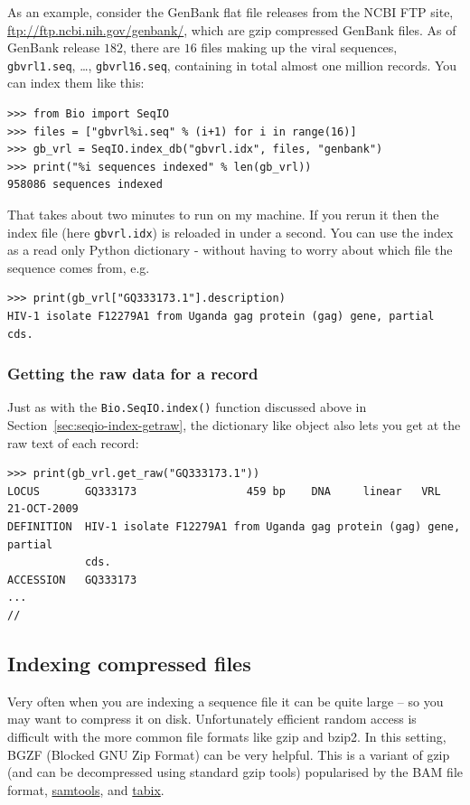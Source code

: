 \documentclass{report}
\begin{document}
As an example, consider the GenBank flat file releases from the NCBI FTP site,
\url{ftp://ftp.ncbi.nih.gov/genbank/}, which are gzip compressed GenBank files.
As of GenBank release $182$, there are $16$ files making up the viral sequences,
\texttt{gbvrl1.seq}, \ldots, \texttt{gbvrl16.seq}, containing in total almost
one million records. You can index them like this:

\begin{verbatim}
>>> from Bio import SeqIO
>>> files = ["gbvrl%i.seq" % (i+1) for i in range(16)]
>>> gb_vrl = SeqIO.index_db("gbvrl.idx", files, "genbank")
>>> print("%i sequences indexed" % len(gb_vrl))
958086 sequences indexed
\end{verbatim}

That takes about two minutes to run on my machine. If you rerun it then the
index file (here \texttt{gbvrl.idx}) is reloaded in under a second. You can
use the index as a read only Python dictionary - without having to worry
about which file the sequence comes from, e.g.

\begin{verbatim}
>>> print(gb_vrl["GQ333173.1"].description)
HIV-1 isolate F12279A1 from Uganda gag protein (gag) gene, partial cds.
\end{verbatim}

\subsubsection{Getting the raw data for a record}

Just as with the \verb|Bio.SeqIO.index()| function discussed above in
Section~\ref{sec:seqio-index-getraw}, the dictionary like object also lets you
get at the raw text of each record:

\begin{verbatim}
>>> print(gb_vrl.get_raw("GQ333173.1"))
LOCUS       GQ333173                 459 bp    DNA     linear   VRL 21-OCT-2009
DEFINITION  HIV-1 isolate F12279A1 from Uganda gag protein (gag) gene, partial
            cds.
ACCESSION   GQ333173
...
//
\end{verbatim}

\subsection{Indexing compressed files}
\label{sec:SeqIO-index-bgzf}

Very often when you are indexing a sequence file it can be quite large -- so
you may want to compress it on disk. Unfortunately efficient random access
is difficult with the more common file formats like gzip and bzip2. In this
setting, BGZF (Blocked GNU Zip Format) can be very helpful. This is a variant
of gzip (and can be decompressed using standard gzip tools) popularised by
the BAM file format, \href{http://samtools.sourceforge.net/}{samtools}, and
\href{http://samtools.sourceforge.net/tabix.shtml}{tabix}.
\end{document}
